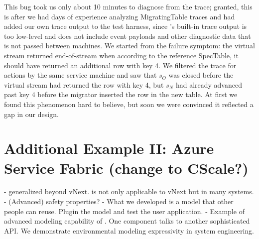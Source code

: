 This bug took us only about 10 minutes to diagnose from the trace; granted, this is after we had days of experience analyzing MigratingTable traces and had added our own trace output to the test harness, since \psharp's built-in trace output is too low-level and does not include event payloads and other diagnostic data that is not passed between machines.  We started from the failure symptom: the virtual stream returned end-of-stream when according to the reference SpecTable, it should have returned an additional row with key 4.  We filtered the trace for actions by the same service machine and saw that $s_O$ was closed before the virtual stream had returned the row with key 4, but $s_N$ had already advanced past key 4 before the migrator inserted the row in the new table.  At first we found this phenomenon hard to believe, but soon we were convinced it reflected a gap in our design.


\section{Additional Example II: Azure Service Fabric (change to CScale?)}
\label{sec:cases:fabric}

- \psharp generalized beyond vNext. \psharp is not only applicable to vNext but in many systems.
- (Advanced) safety properties?
- What we developed is a model that other people can reuse. Plugin the model and test the user application.
- Example of advanced modeling capability of \psharp. One component talks to another sophisticated API. We demonstrate environmental modeling expressivity in system engineering.


